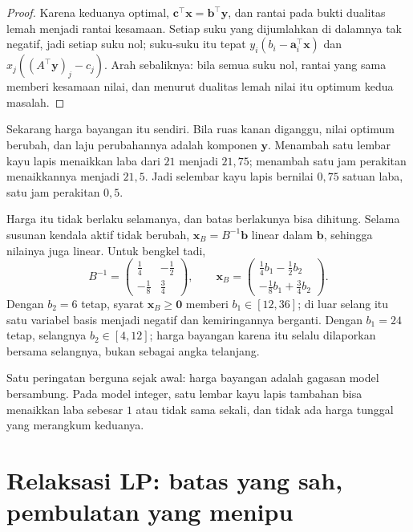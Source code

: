 \begin{proof}
Karena keduanya optimal, $\mathbf{c}^{\top}\mathbf{x}=\mathbf{b}^{\top}\mathbf{y}$, dan
rantai pada bukti dualitas lemah menjadi rantai kesamaan. Setiap suku yang dijumlahkan di
dalamnya tak negatif, jadi setiap suku nol; suku-suku itu tepat
$y_{i}(b_{i}-\mathbf{a}_{i}^{\top}\mathbf{x})$ dan
$x_{j}((A^{\top}\mathbf{y})_{j}-c_{j})$. Arah sebaliknya: bila semua suku nol, rantai yang
sama memberi kesamaan nilai, dan menurut dualitas lemah nilai itu optimum kedua masalah.
\end{proof}

Sekarang harga bayangan itu sendiri. Bila ruas kanan diganggu, nilai optimum
berubah, dan laju perubahannya adalah komponen $\mathbf{y}$. Menambah satu lembar kayu lapis
menaikkan laba dari $21$ menjadi $21{,}75$; menambah satu jam perakitan menaikkannya menjadi
$21{,}5$. Jadi selembar kayu lapis bernilai $0{,}75$ satuan laba, satu jam perakitan
$0{,}5$.

Harga itu tidak berlaku selamanya, dan batas berlakunya bisa dihitung. Selama susunan
kendala aktif tidak berubah, $\mathbf{x}_{B}=B^{-1}\mathbf{b}$ linear dalam $\mathbf{b}$,
sehingga nilainya juga linear. Untuk bengkel tadi,
\[
  B^{-1}=\begin{pmatrix}\tfrac14&-\tfrac12\\[2pt]-\tfrac18&\tfrac34\end{pmatrix},
  \qquad
  \mathbf{x}_{B}=\begin{pmatrix}\tfrac14b_{1}-\tfrac12b_{2}\\[2pt]
  -\tfrac18b_{1}+\tfrac34b_{2}\end{pmatrix}.
\]
Dengan $b_{2}=6$ tetap, syarat $\mathbf{x}_{B}\ge\mathbf{0}$ memberi $b_{1}\in[12,36]$; di
luar selang itu satu variabel basis menjadi negatif dan kemiringannya berganti. Dengan $b_{1}=24$ tetap, selangnya $b_{2}\in[4,12]$; harga bayangan karena itu selalu
dilaporkan bersama selangnya, bukan sebagai angka telanjang.

Satu peringatan berguna sejak awal: harga bayangan adalah gagasan model bersambung. Pada
model integer, satu lembar kayu lapis tambahan bisa menaikkan laba sebesar $1$ atau tidak
sama sekali, dan tidak ada harga tunggal yang merangkum keduanya.

\section{Relaksasi LP: batas yang sah, pembulatan yang menipu}

